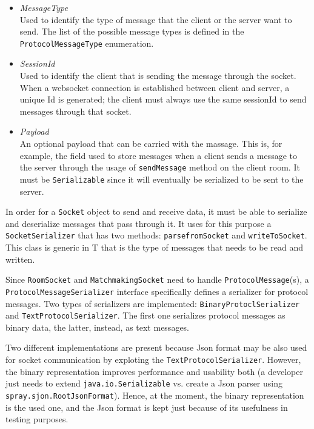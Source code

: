 \begin{itemize}
	\item \textit{MessageType} \\
	Used to identify the type of message that the client or the server want to send. The list of the possible message types is defined in the \texttt{ProtocolMessageType} enumeration.
	\item \textit{SessionId} \\
	Used to identify the client that is sending the message through the socket. When a websocket connection is established between client and server, a unique Id is generated; the client must always use the same sessionId to send messages through that socket.
	\item \textit{Payload} \\ 
	An optional payload that can be carried with the massage. This is, for example, the field used to store messages when a client sends a message to the server through the usage of \texttt{sendMessage} method on the client room. It must be \texttt{Serializable} since it will eventually be serialized to be sent to the server.
\end{itemize}

In order for a \texttt{Socket} object to send and receive data, it must be able to serialize and deserialize messages that pass through it. It uses for this purpose a \texttt{SocketSerializer} that has two methods: \texttt{parsefromSocket} and \texttt{writeToSocket}. This class is generic in T that is the type of messages that needs to be read and written.

Since \texttt{RoomSocket} and \texttt{MatchmakingSocket} need to handle \texttt{ProtocolMessage}(s), a \texttt{ProtocolMessageSerializer} interface specifically defines a serializer for protocol messages. Two types of serializers are implemented: \texttt{BinaryProtoclSerializer} and \texttt{TextProtocolSerializer}. The first one serializes protocol messages as binary data, the latter, instead, as text messages.
 
Two different implementations are present because Json format may be also used for socket communication by exploting the \texttt{TextProtocolSerializer}. However, the binary representation improves performance and usability both (a developer just needs to extend \texttt{java.io.Serializable} vs. create a Json parser using \texttt{spray.sjon.RootJsonFormat}). Hence, at the moment, the binary representation is the used one, and the Json format is kept just because of its usefulness in testing purposes.

